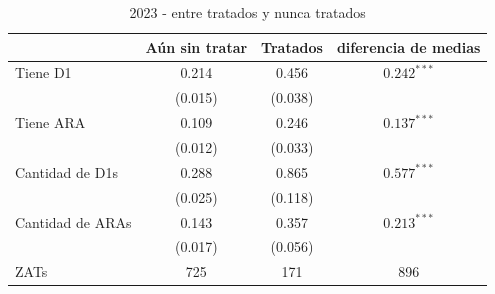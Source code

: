 \documentclass{article}
\begin{document}
\begin{table} [H]
  \centering
  \caption{2023 - entre tratados y nunca tratados}
  \label{tab:d1_ara_2023}
  \begin{tabular}{l c c c}
    \toprule
    & \textbf{Aún sin tratar} & \textbf{Tratados} & \textbf{diferencia de medias} \\
    \midrule
    Tiene D1 & 0.214 & 0.456 & $0.242^{***}$ \\
    & (0.015) & (0.038) & \\
    Tiene ARA & 0.109 & 0.246 & $0.137^{***}$ \\
    & (0.012) & (0.033) & \\
    Cantidad de D1s & 0.288 & 0.865 & $0.577^{***}$ \\
    & (0.025) & (0.118) & \\
    Cantidad de ARAs & 0.143 & 0.357 & $0.213^{***}$ \\
    & (0.017) & (0.056) & \\
    \midrule
    ZATs & 725 & 171 & 896 \\
    \bottomrule
  \end{tabular}
\end{table}
\end{document}
